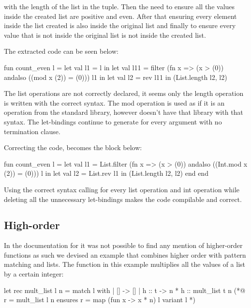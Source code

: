  with the length of the list in the 
tuple. Then the need to ensure all the values inside the created list are positive and even. After that ensuring every element inside
the list created is also inside the original list and finally to ensure every value that is not inside the original list is not inside
the created list.

The extracted code can be seen below:

\begin{cakeml}
fun count_even l =
  let val l1 = l in
  let val l11 = filter (fn x => (x > (0)) andalso ((mod x (2)) = (0))) l1 in
  let val l2 = rev l11 in (List.length l2, l2)
\end{cakeml}

The list operations are not correctly declared, it seems only the length operation is written with the correct syntax. The mod operation
is used as if it is an operation from the standard library, however \cml doesn't have that library with that syntax. The let-bindings 
continue to generate for every argument with no termination clause.

Correcting the code, becomes the block below:

\begin{cakeml}
fun count_even l =
  let val l1 = List.filter (fn x => (x > (0)) andalso ((Int.mod x (2)) = (0))) l in
  let val l2 = List.rev l1 in (List.length l2, l2) end end
\end{cakeml}

Using the correct syntax calling for every list operation and int operation while deleting all the unnecessary let-bindings makes the
code compilable and correct.

\subsection{High-order}

In the documentation for \cml it was not possible to find any mention of higher-order functions as such we devised an example that
combines higher order with pattern matching and lists. The function in this example multiplies all the values of a list by a certain
integer:

\begin{gospell}
let rec mult_list l n =
    match l with
    | [] -> []
    | h :: t -> n * h :: mult_list t n
(*@ r = mult_list l n
        ensures r = map (fun x -> x * n) l
        variant l *)
\end{gospell}

